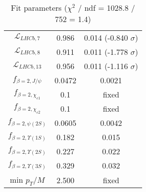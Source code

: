 \begin{table}[h!]
\begin{tabular}{c|c|c}
$\mathcal L_{LHCb,7}$ & 0.986 & 0.014 (-0.840 $\sigma$) \\
$\mathcal L_{LHCb,8}$ & 0.911 & 0.011 (-1.778 $\sigma$) \\
$\mathcal L_{LHCb,13}$ & 0.956 & 0.011 (-1.116 $\sigma$) \\
$f_{\beta=2,J/\psi}$ & 0.0472 & 0.0021 \\
$f_{\beta=2,\chi_{c1}}$ & 0.1 & fixed \\
$f_{\beta=2,\chi_{c2}}$ & 0.1 & fixed \\
$f_{\beta=2,\psi(2S)}$ & 0.0605 & 0.0042 \\
$f_{\beta=2,\Upsilon(1S)}$ & 0.182 & 0.015 \\
$f_{\beta=2,\Upsilon(2S)}$ & 0.227 & 0.022 \\
$f_{\beta=2,\Upsilon(3S)}$ & 0.329 & 0.032 \\
min $p_T/M$ & 2.500 & fixed \\
\end{tabular}
\caption{Fit parameters ($\chi^2$ / ndf = 1028.8 / 752 = 1.4)}
\end{table}
